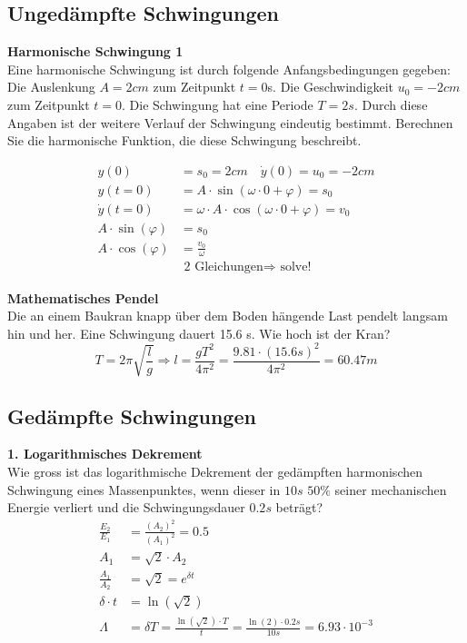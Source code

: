 \newpage
\subsection{Ungedämpfte Schwingungen}
\textbf{Harmonische Schwingung 1}\\
Eine harmonische Schwingung ist durch folgende Anfangsbedingungen gegeben: Die Auslenkung $A=2cm$ zum Zeitpunkt $t = 0$s. Die Geschwindigkeit $u_0 = -2cm$ zum Zeitpunkt $t = 0$. Die Schwingung hat eine Periode $T=2s$. Durch diese Angaben ist der weitere Verlauf
der Schwingung eindeutig bestimmt. Berechnen Sie die harmonische Funktion, die diese Schwingung beschreibt.

\begin{align*}
y(0) &=s_0 =  2cm\quad \dot{y}(0) = u_0 = -2cm\\
y(t = 0) &= A \cdot \sin(\omega \cdot 0 + \varphi) = s_0\\
\dot{y}(t = 0) &= \omega \cdot  A \cdot \cos(\omega \cdot 0 + \varphi) = v_0\\
A\cdot \sin(\varphi) &= s_0\\
A\cdot \cos(\varphi) &=\frac{v_0}{\omega}\\
&\textrm{ 2 Gleichungen} \Rightarrow \textrm{ solve!}
\end{align*}

\textbf{Mathematisches Pendel}\\
Die an einem Baukran knapp über dem Boden hängende Last pendelt langsam hin und her. Eine Schwingung dauert 15.6 s. Wie hoch ist der Kran?
\[
	T= 2\pi\sqrt{\frac{l}{g}}\Rightarrow l=\frac{gT^2}{4\pi^2} = \frac{9.81\cdot (15.6s)^2}{4\pi^2} = 60.47m
\]

\subsection{Gedämpfte Schwingungen}
\textbf{1. Logarithmisches Dekrement}\\
Wie gross ist das logarithmische Dekrement der gedämpften harmonischen Schwingung eines Massenpunktes, wenn dieser in $10s$ $50\%$ seiner mechanischen Energie verliert und die Schwingungsdauer $0.2s$ beträgt?
\begin{align*}
	\frac{E_2}{E_1} &= \frac{(A_2)^2}{(A_1)^2} = 0.5\\
	A_1&=\sqrt{2}\cdot A_2\\
	\frac{A_1}{A_2} &= \sqrt{2}=e^{\delta t}\\
	\delta \cdot t&= \ln(\sqrt{2})\\
	\Lambda&=\delta T = \frac{\ln(\sqrt{2})\cdot T}{t}=\frac{\ln(2)\cdot 0.2s}{10s}=6.93\cdot 10^{-3}
\end{align*}

